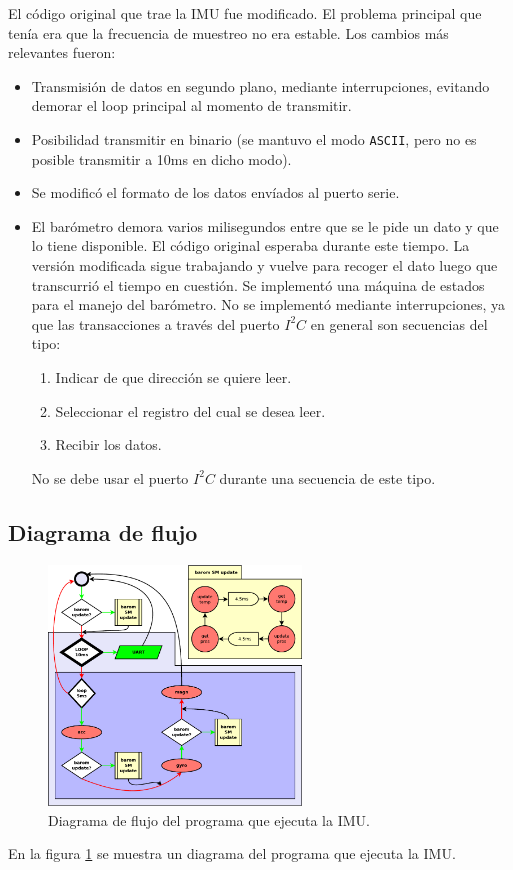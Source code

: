 \documentclass[main]{subfiles}
\begin{document}
El código original que trae la IMU fue modificado. El problema principal que ten\'ia era que la frecuencia de muestreo no era estable. Los cambios m\'as relevantes fueron:
\begin{itemize}
\item Transmisión de datos en segundo plano, mediante interrupciones, evitando demorar el loop principal al momento de transmitir.
\item Posibilidad transmitir en binario (se mantuvo el modo \verb+ASCII+, pero no es posible transmitir a 10ms en dicho modo).
\item Se modificó el formato de los datos envíados al puerto serie.
\item El barómetro demora varios milisegundos entre que se le pide un dato y que lo tiene disponible. El código original esperaba durante este tiempo. La versión modificada sigue trabajando y vuelve para recoger el dato luego que transcurrió el tiempo en cuestión. Se implement\'o una m\'aquina de estados para el manejo del bar\'ometro. No se implementó mediante interrupciones, ya que las transacciones a trav\'es del puerto $I^2C$ en general son secuencias del tipo:
  \begin{enumerate}
  \item Indicar de que direcci\'on se quiere leer.
  \item Seleccionar el registro del cual se desea leer.
  \item Recibir los datos.
  \end{enumerate}
No se debe usar el puerto $I^2C$ durante una secuencia de este tipo.
\end{itemize}

\subsection{Diagrama de flujo}
\label{sec:software:mongoose-diagrama-de-flujo}

\begin{figure}
\centering
\vspace{-30pt}
  \includegraphics[width=0.6\textwidth]{./pics_software/imu-tight.pdf}
\caption{Diagrama de flujo del programa que ejecuta la IMU.}
\vspace{-30pt}
\label{fig:software:imu.pdf}
\vspace{-15pt}
\end{figure}
En la figura \ref{fig:software:imu.pdf} se muestra un diagrama del programa que ejecuta la IMU.
\end{document}
